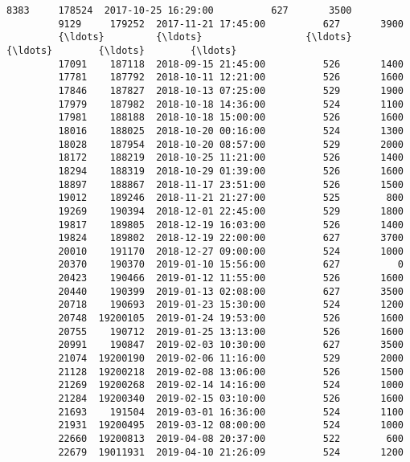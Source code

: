 \documentclass[11pt]{article}
\begin{document}
\begin{Verbatim}[commandchars=\\\{\}]
         8383     178524  2017-10-25 16:29:00          627       3500              
         9129     179252  2017-11-21 17:45:00          627       3900              
         {\ldots}         {\ldots}                  {\ldots}          {\ldots}        {\ldots}        {\ldots}   
         17091    187118  2018-09-15 21:45:00          526       1400              
         17781    187792  2018-10-11 12:21:00          526       1600              
         17846    187827  2018-10-13 07:25:00          529       1900              
         17979    187982  2018-10-18 14:36:00          524       1100              
         17981    188188  2018-10-18 15:00:00          526       1600              
         18016    188025  2018-10-20 00:16:00          524       1300              
         18028    187954  2018-10-20 08:57:00          529       2000              
         18172    188219  2018-10-25 11:21:00          526       1400              
         18294    188319  2018-10-29 01:39:00          526       1600              
         18897    188867  2018-11-17 23:51:00          526       1500              
         19012    189246  2018-11-21 21:27:00          525        800              
         19269    190394  2018-12-01 22:45:00          529       1800              
         19817    189805  2018-12-19 16:03:00          526       1400              
         19824    189802  2018-12-19 22:00:00          627       3700              
         20010    191170  2018-12-27 09:00:00          524       1000              
         20370    190370  2019-01-10 15:56:00          627          0              
         20423    190466  2019-01-12 11:55:00          526       1600              
         20440    190399  2019-01-13 02:08:00          627       3500              
         20718    190693  2019-01-23 15:30:00          524       1200              
         20748  19200105  2019-01-24 19:53:00          526       1600              
         20755    190712  2019-01-25 13:13:00          526       1600              
         20991    190847  2019-02-03 10:30:00          627       3500              
         21074  19200190  2019-02-06 11:16:00          529       2000              
         21128  19200218  2019-02-08 13:06:00          526       1500              
         21269  19200268  2019-02-14 14:16:00          524       1000              
         21284  19200340  2019-02-15 03:10:00          526       1600              
         21693    191504  2019-03-01 16:36:00          524       1100              
         21931  19200495  2019-03-12 08:00:00          524       1000              
         22660  19200813  2019-04-08 20:37:00          522        600              
         22679  19011931  2019-04-10 21:26:09          524       1200              
         

\end{Verbatim}
\end{document}
